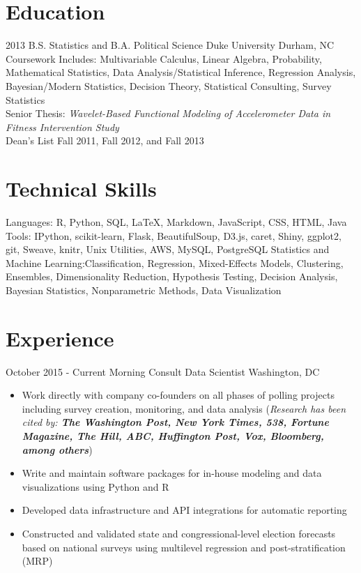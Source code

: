 \documentclass[10pt,a4paper,sans]{moderncv}        %
\begin{document}
\makecvtitle\vspace{-6ex}                          %

\section{Education}
\cventry
	{2013}
	{B.S. Statistics and B.A. Political Science}
	{Duke University}
	{Durham, NC}
	{}
	{Coursework Includes: Multivariable Calculus, Linear Algebra, Probability, Mathematical Statistics,
	Data Analysis/Statistical Inference, Regression Analysis, Bayesian/Modern Statistics, Decision Theory,
	Statistical Consulting, Survey Statistics
	\\Senior Thesis: \textit{Wavelet-Based Functional Modeling of Accelerometer Data in Fitness Intervention Study}
	\\Dean's List Fall 2011, Fall 2012, and Fall 2013}

\section{Technical Skills}
\cvitem
  {Languages:}
  {R, Python, SQL, \LaTeX, Markdown, JavaScript, CSS, HTML, Java}
\cvitem
  {Tools:}
  {IPython, scikit-learn, Flask, BeautifulSoup, D3.js, caret, Shiny, ggplot2, git, Sweave, knitr, Unix Utilities, AWS, MySQL, PostgreSQL}
\cvitem
  {Statistics and Machine Learning:}{Classification, Regression, Mixed-Effects Models, Clustering, Ensembles, Dimensionality Reduction,
  Hypothesis Testing, Decision Analysis, Bayesian Statistics, Nonparametric Methods, Data Visualization}

\section{Experience}
\cventry
  {October 2015 - Current}
  {Morning Consult Data Scientist}
  {}
  {Washington, DC}
  {}
  {
    \begin{itemize}
		\item{Work directly with company co-founders on all phases of polling projects including survey creation, monitoring, and data analysis (\textit{Research has been cited by: \textbf{The Washington Post, New York Times, 538, Fortune Magazine, The Hill, ABC, Huffington Post, Vox, Bloomberg, among others}})}
 		\item{Write and maintain software packages for in-house modeling and data visualizations using Python and R}
		\item{Developed data infrastructure and API integrations for automatic reporting}
		\item{Constructed and validated state and congressional-level election forecasts based on national surveys using multilevel regression and post-stratification (MRP)}
    \end{itemize}
  }
\end{document}

